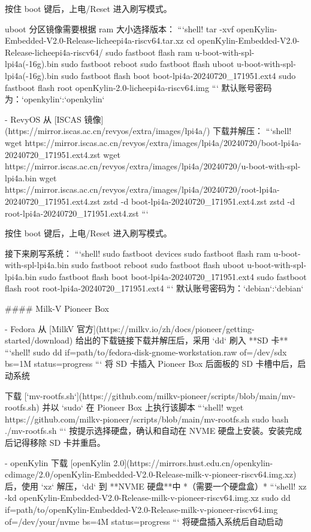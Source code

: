\documentclass{article}
\begin{document}
\begin{markdown}
按住 boot 键后，上电/Reset 进入刷写模式。

uboot 分区镜像需要根据 ram 大小选择版本：
```shell!
tar -xvf openKylin-Embedded-V2.0-Release-licheepi4a-riscv64.tar.xz
cd openKylin-Embedded-V2.0-Release-licheepi4a-riscv64/
sudo fastboot flash ram u-boot-with-spl-lpi4a(-16g).bin
sudo fastboot reboot
sudo fastboot flash uboot u-boot-with-spl-lpi4a(-16g).bin
sudo fastboot flash boot boot-lpi4a-20240720_171951.ext4
sudo fastboot flash root openKylin-2.0-licheepi4a-riscv64.img
```
默认账号密码为：`openkylin`:`openkylin`

- RevyOS
从 [ISCAS 镜像](https://mirror.iscas.ac.cn/revyos/extra/images/lpi4a/) 下载并解压：
```shell!
wget https://mirror.iscas.ac.cn/revyos/extra/images/lpi4a/20240720/boot-lpi4a-20240720_171951.ext4.zst
wget https://mirror.iscas.ac.cn/revyos/extra/images/lpi4a/20240720/u-boot-with-spl-lpi4a.bin
wget https://mirror.iscas.ac.cn/revyos/extra/images/lpi4a/20240720/root-lpi4a-20240720_171951.ext4.zst
zstd -d boot-lpi4a-20240720_171951.ext4.zst
zstd -d root-lpi4a-20240720_171951.ext4.zst
```

按住 boot 键后，上电/Reset 进入刷写模式。

接下来刷写系统：
```shell!
sudo fastboot devices
sudo fastboot flash ram u-boot-with-spl-lpi4a.bin 
sudo fastboot reboot
sudo fastboot flash uboot u-boot-with-spl-lpi4a.bin
sudo fastboot flash boot boot-lpi4a-20240720_171951.ext4
sudo fastboot flash root root-lpi4a-20240720_171951.ext4
```
默认账号密码为：`debian`:`debian`

#### Milk-V Pioneer Box

- Fedora
从 [MilkV 官方](https://milkv.io/zh/docs/pioneer/getting-started/download) 给出的下载链接下载并解压后，采用 `dd` 刷入 **SD 卡**
```shell!
sudo dd if=path/to/fedora-disk-gnome-workstation.raw of=/dev/sdx bs=1M status=progress
```
将 SD 卡插入 Pioneer Box 后面板的 SD 卡槽中后，启动系统

下载 [`mv-rootfs.sh`](https://github.com/milkv-pioneer/scripts/blob/main/mv-rootfs.sh) 并以 `sudo` 在 Pioneer Box 上执行该脚本
```shell!
wget https://github.com/milkv-pioneer/scripts/blob/main/mv-rootfs.sh
sudo bash ./mv-rootfs.sh
```
按提示选择硬盘，确认和自动在 NVME 硬盘上安装。安装完成后记得移除 SD 卡并重启。

- openKylin
下载 [openKylin 2.0](https://mirrors.hust.edu.cn/openkylin-cdimage/2.0/openKylin-Embedded-V2.0-Release-milk-v-pioneer-riscv64.img.xz) 后，使用 `xz` 解压，`dd` 到 **NVME 硬盘**中 *（需要一个硬盘盒）*
```shell!
xz -kd openKylin-Embedded-V2.0-Release-milk-v-pioneer-riscv64.img.xz
sudo dd if=path/to/openKylin-Embedded-V2.0-Release-milk-v-pioneer-riscv64.img of=/dev/your/nvme bs=4M status=progress
```
将硬盘插入系统后自动启动


\end{markdown}
\end{document}
